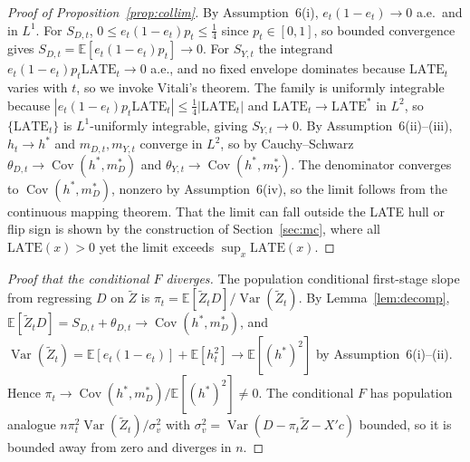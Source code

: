 \documentclass[11pt]{article}
\theoremstyle{plain}
\theoremstyle{definition}
\newcommand{\E}{\mathbb{E}}
\newcommand{\Cov}{\operatorname{Cov}}
\newcommand{\Var}{\operatorname{Var}}
\newcommand{\Zt}{\tilde{Z}}
\begin{document}
\begin{proof}[Proof of Proposition~\ref{prop:collim}]
By Assumption~6(i), $e_t(1-e_t)\to 0$ a.e.\ and in $L^1$. For $S_{D,t}$, $0\le e_t(1-e_t)p_t\le\tfrac14$ since $p_t\in[0,1]$, so bounded convergence gives $S_{D,t}=\E[e_t(1-e_t)p_t]\to 0$. For $S_{Y,t}$ the integrand $e_t(1-e_t)p_t\mathrm{LATE}_t\to 0$ a.e., and no fixed envelope dominates because $\mathrm{LATE}_t$ varies with $t$, so we invoke Vitali's theorem. The family is uniformly integrable because $|e_t(1-e_t)p_t\mathrm{LATE}_t|\le\tfrac14|\mathrm{LATE}_t|$ and $\mathrm{LATE}_t\to\mathrm{LATE}^\ast$ in $L^2$, so $\{\mathrm{LATE}_t\}$ is $L^1$-uniformly integrable, giving $S_{Y,t}\to 0$. By Assumption~6(ii)--(iii), $h_t\to h^\ast$ and $m_{D,t},m_{Y,t}$ converge in $L^2$, so by Cauchy--Schwarz $\theta_{D,t}\to\Cov(h^\ast,m_D^\ast)$ and $\theta_{Y,t}\to\Cov(h^\ast,m_Y^\ast)$. The denominator converges to $\Cov(h^\ast,m_D^\ast)$, nonzero by Assumption~6(iv), so the limit follows from the continuous mapping theorem. That the limit can fall outside the LATE hull or flip sign is shown by the construction of Section~\ref{sec:mc}, where all $\mathrm{LATE}(x)>0$ yet the limit exceeds $\sup_x\mathrm{LATE}(x)$.
\end{proof}

\begin{proof}[Proof that the conditional $F$ diverges]
The population conditional first-stage slope from regressing $D$ on $\Zt$ is $\pi_t=\E[\Zt_t D]/\Var(\Zt_t)$. By Lemma~\ref{lem:decomp}, $\E[\Zt_t D]=S_{D,t}+\theta_{D,t}\to\Cov(h^\ast,m_D^\ast)$, and $\Var(\Zt_t)=\E[e_t(1-e_t)]+\E[h_t^2]\to\E[(h^\ast)^2]$ by Assumption~6(i)--(ii). Hence $\pi_t\to\Cov(h^\ast,m_D^\ast)/\E[(h^\ast)^2]\neq 0$. The conditional $F$ has population analogue $n\pi_t^2\Var(\Zt_t)/\sigma_v^2$ with $\sigma_v^2=\Var(D-\pi_t\Zt-X'c)$ bounded, so it is bounded away from zero and diverges in $n$.
\end{proof}
\end{document}
